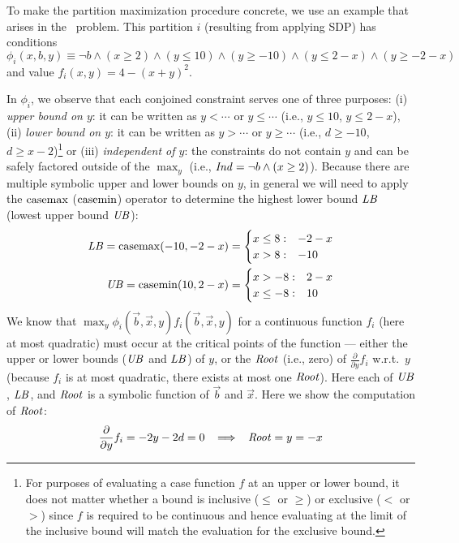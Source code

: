 To make the partition maximization procedure concrete, 
we use an example that arises in the \MarsRover\ problem.  
This partition $i$ (resulting
from applying SDP) has conditions $\phi_i(x,b,y) \equiv \neg b \wedge
(x\geq 2) \wedge (y\leq 10) \wedge (y\geq -10) \wedge (y\leq 2-x) \wedge
(y\geq -2-x)$ and value $f_i(x,y) = 4 - (x+y)^2 $.

In $\phi_i$, we observe that each conjoined constraint serves one of
three purposes: (i) \emph{upper bound on $y$}: it can be written
as $y < \cdots$ or $y \leq \cdots$ (i.e., $y \leq 10$, $y \leq 2 -
x$), (ii) \emph{lower bound on $y$}: it can be written as $y >
\cdots$ or $y \geq \cdots$ 
(i.e., $d \geq -10$, $d \geq x - 2$)\footnote{For purposes of evaluating
a case function $f$ at an upper or lower bound,
it does not matter whether a bound is inclusive ($\leq$ or $\geq$)
or exclusive ($<$ or $>$) since $f$ is required to be continuous
and hence evaluating at the limit of the inclusive bound will
match the evaluation for the exclusive bound.}
or (iii) \emph{independent of $y$}: the constraints do not contain $y$
and can be safely factored outside of the $\max_y$ (i.e., 
$\mathit{Ind} = \neg b \land (x \geq 2)$).  
Because there are multiple symbolic upper and lower
bounds on $y$, in general we will need to apply the $\mathrm{casemax}$
($\mathrm{casemin}$) operator to determine the highest lower bound $\mathit{LB}$
(lowest upper bound $\mathit{UB}$):
{\footnotesize
\begin{align*}
\mathit{LB} = \mathrm{casemax}(-10,-2 -x) & = \begin{cases}
x \leq 8: & -2 -x \\ 
x > 8: &-10\\ 
\end{cases}\\
\mathit{UB} = \mathrm{casemin}(10, 2-x) & = \begin{cases}
x > -8: & 2 -x \\ 
x \leq -8: &10\\ 
\end{cases}
\end{align*}
} We know that $\max_y \phi_i(\vec{b},\vec{x},y)
f_i(\vec{b},\vec{x},y)$ for a continuous function $f_i$ (here at most
quadratic) must occur at the critical points of the function --- 
either the upper or lower bounds ($\mathit{UB}$ and $\mathit{LB}$) of $y$, 
or the $\mathit{Root}$ (i.e., zero) of $\frac{\partial}{\partial y} f_i$ 
w.r.t.\ $y$ (because $f_i$ is at most quadratic, there exists 
at most one $\mathit{Root}$).  Here each of $\mathit{UB}$, $\mathit{LB}$, and $\mathit{Root}$
is a symbolic function of $\vec{b}$ and $\vec{x}$.  
Here we show the computation of $\mathit{Root}$:
{\footnotesize 
\begin{align*}
\frac{\partial}{\partial y} f_i = - 2y - 2d = 0 \;\;\; \Longrightarrow \;\;\; \mathit{Root} = y = -x
\end{align*}}


